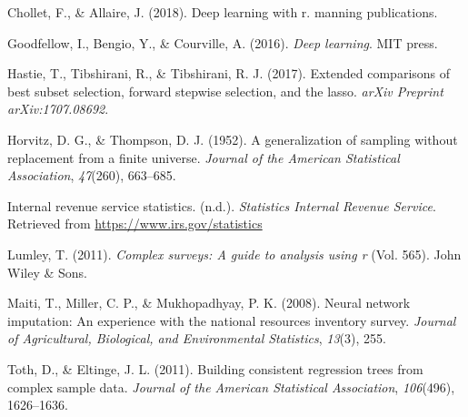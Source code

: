\documentclass[12pt,twoside]{reedthesis}
\begin{document}
\hypertarget{ref-chollet2018deep}{}
Chollet, F., \& Allaire, J. (2018). Deep learning with r. manning
publications.

\hypertarget{ref-goodfellow2016deep}{}
Goodfellow, I., Bengio, Y., \& Courville, A. (2016). \emph{Deep
learning}. MIT press.

\hypertarget{ref-hastie2017extended}{}
Hastie, T., Tibshirani, R., \& Tibshirani, R. J. (2017). Extended
comparisons of best subset selection, forward stepwise selection, and
the lasso. \emph{arXiv Preprint arXiv:1707.08692}.

\hypertarget{ref-horvitz1952generalization}{}
Horvitz, D. G., \& Thompson, D. J. (1952). A generalization of sampling
without replacement from a finite universe. \emph{Journal of the
American Statistical Association}, \emph{47}(260), 663--685.

\hypertarget{ref-IRS2015}{}
Internal revenue service statistics. (n.d.). \emph{Statistics \textbar{}
Internal Revenue Service}. Retrieved from
\url{https://www.irs.gov/statistics}

\hypertarget{ref-lumley2011complex}{}
Lumley, T. (2011). \emph{Complex surveys: A guide to analysis using r}
(Vol. 565). John Wiley \& Sons.

\hypertarget{ref-maiti2008neural}{}
Maiti, T., Miller, C. P., \& Mukhopadhyay, P. K. (2008). Neural network
imputation: An experience with the national resources inventory survey.
\emph{Journal of Agricultural, Biological, and Environmental
Statistics}, \emph{13}(3), 255.

\hypertarget{ref-toth2011building}{}
Toth, D., \& Eltinge, J. L. (2011). Building consistent regression trees
from complex sample data. \emph{Journal of the American Statistical
Association}, \emph{106}(496), 1626--1636.


\end{document}
